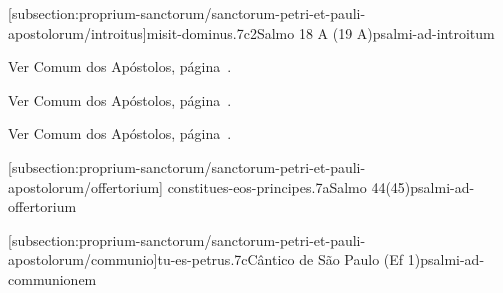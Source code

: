 \def\Prefix{subsection:proprium-sanctorum/sanctorum-petri-et-pauli-apostolorum}

[\Prefix/introitus]{misit-dominus.7c2}{Salmo 18 A (19 A)}{psalmi-ad-introitum}

\begin{rubrica}
	Ver Comum dos Apóstolos, página~\pageref{subsection:communia/commune-apostolorum/psalmus-responsorius}.
\end{rubrica}
\vspace{-2mm}

\begin{rubrica}
	Ver Comum dos Apóstolos, página~\pageref{subsection:communia/commune-apostolorum/alleluia}.
\end{rubrica}
\vspace{-2mm}

\begin{rubrica}
	Ver Comum dos Apóstolos, página~\pageref{subsection:communia/commune-apostolorum/psalmus-alleluiaticus}.
\end{rubrica}
\vspace{-2mm}

\AllowPageFlush

[\Prefix/offertorium]
{constitues-eos-principes.7a}{Salmo 44(45)}{psalmi-ad-offertorium}

\AllowPageBreak

[\Prefix/communio]{tu-es-petrus.7c}{Cântico de São Paulo (Ef 1)}{psalmi-ad-communionem}

\AllowPageFlush